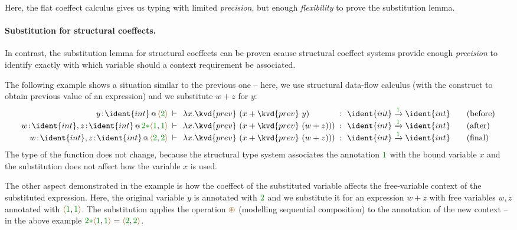 Here, the flat coeffect calculus gives us typing with limited \emph{precision}, but 
enough \emph{flexibility} to prove the substitution lemma.

\paragraph{Substitution for structural coeffects.}
In contrast, the substitution lemma for structural coeffects can be proven ecause 
structural coeffect systems provide enough \emph{precision} to identify exactly with 
which variable should a context requirement be associated.

The following example shows a situation similar to the previous one -- here, we use
structural data-flow calculus (with the  construct to obtain previous
value of an expression) and we substitute $w+z$ for $y$:
%
\begin{equation*}
\begin{array}{rclcll}
 \coctx{y\!:\!\ident{int}}{ \alift{\cclrd{2}} } 
  &\narrow{\vdash}& \lambda x.\kvd{prev}~(x + \kvd{prev}~y) &\narrow{:}&
   \ident{int} \xrightarrow{\cclrd{ 1 }} \ident{int} & \quad(\textnormal{before}) \\
\coctx{w\!:\!\ident{int}, z\!:\!\ident{int}}{\cclrd{2}\cclrd{\ast}\alift{\cclrd{1},\cclrd{1}}} 
  &\narrow{\vdash}& \lambda x.\kvd{prev}~(x + \kvd{prev}~(w+z))) &\narrow{:}&
   \ident{int} \xrightarrow{\cclrd{ 1 }} \ident{int} & \quad(\textnormal{after}) \\
\coctx{w\!:\!\ident{int}, z\!:\!\ident{int}}{\alift{\cclrd{2},\cclrd{2}}} 
  &\narrow{\vdash}& \lambda x.\kvd{prev}~(x + \kvd{prev}~(w+z))) &\narrow{:}&
   \ident{int} \xrightarrow{\cclrd{ 1 }} \ident{int} & \quad(\textnormal{final})
\end{array}  
\end{equation*}
%
The type of the function does not change, because the structural type system associates
the annotation $\cclrd{1}$ with the bound variable $x$ and the substitution does not 
affect how the variable $x$ is used.

The other aspect demonstrated in the example is how the coeffect of the substituted 
variable affects the free-variable context of the substituted expression. Here, the
original variable $y$ is annotated with $\cclrd{2}$ and we substitute it for an
expression $w+z$ with free variables $w,z$ annotated with $\alift{\cclrd{1}, \cclrd{1}}$.
The substitution applies the operation $\aseq$ (modelling sequential composition) to 
the annotation of the new context -- in the above example
$\cclrd{2}\cclrd{\ast}\alift{\cclrd{1}, \cclrd{1}}=\alift{\cclrd{2}, \cclrd{2}}$.

